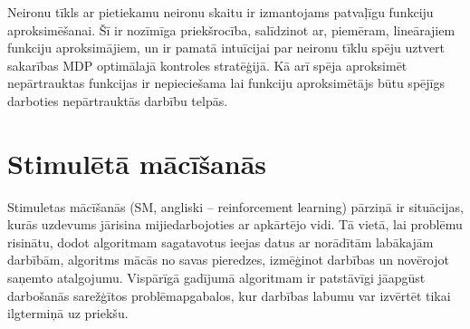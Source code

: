 \documentclass[a0,landscape]{a0poster}
\numberwithin{equation}{section}
\theoremstyle{definition}
\theoremstyle{plain}
\begin{document}
\begin{multicols}{4}
Neironu tīkls ar pietiekamu neironu skaitu ir izmantojams patvaļīgu funkciju aproksimēšanai.
Šī ir nozīmīga priekšrocība, salīdzinot ar, piemēram, lineārajiem funkciju aproksimājiem, un ir pamatā intuīcijai par neironu tīklu spēju uztvert sakarības MDP optimālajā kontroles stratēģijā.
Kā arī spēja aproksimēt nepārtrauktas funkcijas ir nepieciešama lai funkciju aproksimētājs būtu spējīgs darboties nepārtrauktās darbību telpās.

\section*{Stimulētā mācīšanās}
Stimuletas mācīšanās (SM, angliski -- reinforcement learning) pārziņā ir situācijas, kurās uzdevums jārisina mijiedarbojoties ar apkārtējo vidi. 
Tā vietā, lai problēmu risinātu, dodot algoritmam sagatavotus ieejas datus ar norādītām labākajām darbībām, algoritms mācās no savas pieredzes, izmēģinot darbības un novērojot saņemto atalgojumu.
Vispārīgā gadījumā algoritmam ir patstāvīgi jāapgūst darbošanās sarežģītos problēmapgabalos, kur darbības labumu var izvērtēt tikai ilgtermiņā uz priekšu.

\end{multicols}
\end{document}

